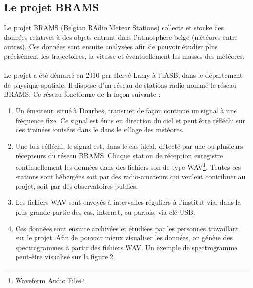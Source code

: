 \documentclass[11pt]{article}
\begin{document}
\subsection{Le projet BRAMS}
Le projet BRAMS (Belgian RAdio Meteor Stations) collecte et stocke des données relatives à des objets entrant dans l'atmosphère belge (météores entre autres).
Ces données sont ensuite analysées afin de pouvoir étudier plus précisément les trajectoires, la vitesse et éventuellement les masses des météores.\\
\\
Le projet a été démarré en 2010 par Hervé Lamy à l'IASB, dans le département de physique spatiale. Il dispose d'un réseau de stations radio nommé le réseau BRAMS. Ce réseau fonctionne de la façon suivante :
\begin{enumerate}
    \item Un émetteur, situé à Dourbes, transmet de façon continue un signal à une fréquence fixe.
          Ce signal est émis en direction du ciel et peut être réfléchi sur des trainées ionisées dans le dans le sillage des météores.
    \item Une fois réfléchi, le signal est, dans le cas idéal, détecté par une ou plusieurs récepteurs du réseau BRAMS.
          Chaque station de réception enregistre continuellement les données dans des fichiers son de type WAV\footnote{Waveform Audio File}.
          Toutes ces stations sont hébergées soit par des radio-amateurs qui veulent contribuer au projet, soit par des observatoires publics.
    \item Les fichiers WAV sont envoyés à intervalles réguliers à l'institut via, dans la plus grande partie des cas, internet, ou parfois, via clé USB.
    \item Ces données sont ensuite archivées et étudiées par les personnes travaillant sur le projet.
          Afin de pouvoir mieux visualiser les données, on génère des spectrogrammes à partir des fichiers WAV.
          Un exemple de spectrogramme peut-être visualisé sur la figure 2.
\end{enumerate}
\end{document}
